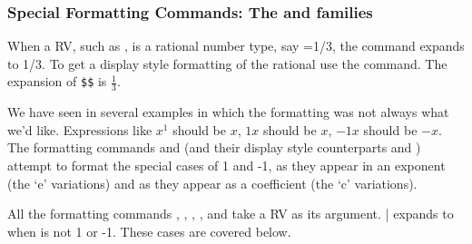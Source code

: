 \documentclass[12pt]{article}
\def\anglemeta#1{\ensuremath{\langle\textit{\texttt{#1}}\rangle}}
\def\meta#1{\textit{\texttt{#1}}}
\let\meta\anglemeta
\begin{document}
\subsubsection{Special Formatting Commands: The \texorpdfstring{\protect{}}{}
and \texorpdfstring{\protect{}}{} families}

When a RV, such as , is a rational number type, say =1/3, the command  expands
to 1/3. To get a display style formatting of the rational use the  command.
The expansion of \texttt{\$\$} is $\frac13$.

We have seen in several examples in which the formatting was not always what we'd like.
Expressions like $x^{1}$ should be $x$, $1x$ should be $x$, $-1x$ should be $-x$.
The formatting commands  and  (and their display style counterparts
 and ) attempt to format the special cases of 1 and -1, as they appear
in an exponent (the `e' variations) and as they appear as a coefficient (the `c' variations).

All the formatting commands , , , , and
 take a RV as its argument.
\cs{\meta{\upshape{c|e}}fmt}|\cs{\meta{\upshape{c|e}}ds} expands to
 when  is not 1 or -1. These cases are covered below.
\end{document}
